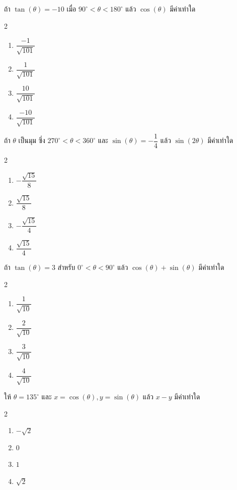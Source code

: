 \newpage
\begin{examplebox}
ถ้า $\tan(\theta)=-10$ เมื่อ $90^{\circ}<\theta<180^{\circ}$ แล้ว $\cos(\theta)$ มีค่าเท่าใด
\begin{multicols}{2}
\begin{enumerate}
\item $\dfrac{-1}{\sqrt{101}}$
\item $\dfrac{1}{\sqrt{101}}$
\item $\dfrac{10}{\sqrt{101}}$
\item $\dfrac{-10}{\sqrt{101}}$
\end{enumerate}
\end{multicols}
\end{examplebox}
\newpage
\begin{examplebox}
ถ้า $\theta$ เป็นมุม ซึ่ง $270^{\circ}<\theta<360^{\circ}$ และ $\sin(\theta)=-\dfrac{1}{4}$ แล้ว $\sin(2\theta)$ มีค่าเท่าใด
\begin{multicols}{2}
\begin{enumerate}
\item $-\dfrac{\sqrt{15}}{8}$
\item $\dfrac{\sqrt{15}}{8}$
\item $-\dfrac{\sqrt{15}}{4}$
\item $\dfrac{\sqrt{15}}{4}$
\end{enumerate}
\end{multicols}
\end{examplebox}

\newpage
\begin{examplebox}
ถ้า $\tan(\theta)=3$ สำหรับ $0^{\circ}<\theta<90^{\circ}$ แล้ว $\cos(\theta)+\sin( \theta)$ มีค่าเท่าใด
\begin{multicols}{2}
\begin{enumerate}
\item $\dfrac{1}{\sqrt{10}}$
\item $\dfrac{2}{\sqrt{10}}$
\item $\dfrac{3}{\sqrt{10}}$
\item $\dfrac{4}{\sqrt{10}}$
\end{enumerate}
\end{multicols}
\end{examplebox}
\newpage
\begin{examplebox}
ให้ $\theta=135^{\circ}$ และ $x=\cos(\theta), y=\sin(\theta)$ แล้ว $x-y$ มีค่าเท่าใด
\begin{multicols}{2}
\begin{enumerate}
\item $-\sqrt{2}$
\item $0$
\item $1$
\item $\sqrt{2}$
\end{enumerate}
\end{multicols}
\end{examplebox}
\newpage
